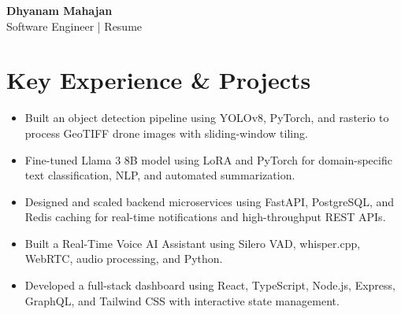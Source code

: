 \documentclass[11pt,a4paper]{article}
\newcommand{\resumeItem}[1]{
  \item\small{#1 \vspace{-2pt}}
}
\begin{document}
\begin{center}
    \textbf{\Huge Dhyanam Mahajan} \\ \vspace{5pt}
    Software Engineer | Resume
\end{center}

\section*{Key Experience \& Projects}
\begin{itemize}
\resumeItem{Built an object detection pipeline using YOLOv8, PyTorch, and rasterio to process GeoTIFF drone images with sliding-window tiling.}

\resumeItem{Fine-tuned Llama 3 8B model using LoRA and PyTorch for domain-specific text classification, NLP, and automated summarization.}

\resumeItem{Designed and scaled backend microservices using FastAPI, PostgreSQL, and Redis caching for real-time notifications and high-throughput REST APIs.}

\resumeItem{Built a Real-Time Voice AI Assistant using Silero VAD, whisper.cpp, WebRTC, audio processing, and Python.}

\resumeItem{Developed a full-stack dashboard using React, TypeScript, Node.js, Express, GraphQL, and Tailwind CSS with interactive state management.}
\end{itemize}
\end{document}
